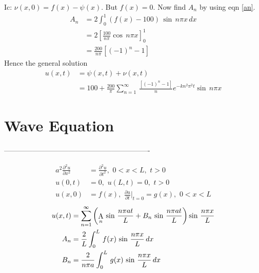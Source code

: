 Ic: $\nu(x,0)=f(x)-\psi(x)$. But $f(x)=0$. Now find $A_n$ by using eqn \eqref{an}. 
\begin{align}
A_n&=2\int_0^1(f(x)-100)\,\sin\,n\pi x\,dx\nonumber\\
&=2\left[\frac{100}{n\pi}\cos\,n\pi x\right]_0^1\nonumber\\
&=\frac{200}{n\pi}[(-1)^n-1]
\end{align}
Hence the general solution
\begin{align*}
u(x,t)&=\psi(x,t)+\nu(x,t)\\
&=100+\frac{200}{\pi}\sum_{n=1}^\infty\,\frac{[(-1)^n-1]}{n}e^{-kn^2\pi^2 t}\sin\,n\pi x
\end{align*}
\section{Wave Equation}
\begin{center}
-------------------------------------------------------------
\end{center}
\begin{align*}
a^2\frac{\partial^2u}{\partial x^2}&=\frac{\partial^2 u}{\partial t^2},\,\,0<x<L,\,\,t>0\\
u(0,t)&=0,\,\,u(L,t)=0,\,\,t>0\\
u(x,0)&=f(x),\,\,\frac{\partial u}{\partial t}\big|_{t=0}=g(x),\,\,0<x<L
\end{align*}
\begin{align*}
u(x,t)&=\sum_{n=1}^\infty\left(\mathop{\mathrm{A}}\limits_n\,\sin\,\frac{n\pi at}{L}+B_n\,\sin\,\frac{n\pi at}{L}\right)\sin\,\frac{n\pi x}{L}\\
A_n&=\frac{2}{L}\int_0^L\,f(x)\,\sin\,\frac{n\pi x}{L}\,dx\\
B_n&=\frac{2}{n\pi a}\int_0^L\,g(x)\,\sin\,\frac{n\pi x}{L}\,dx
\end{align*}

